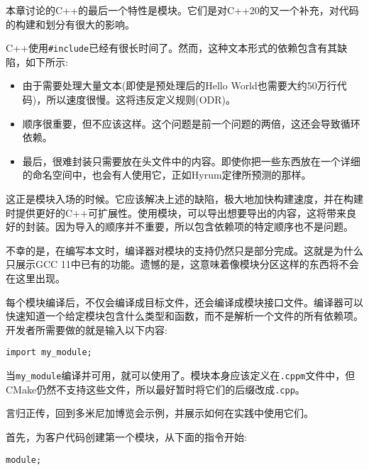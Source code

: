 本章讨论的C++的最后一个特性是模块。它们是对C++20的又一个补充，对代码的构建和划分有很大的影响。

C++使用\texttt{\#include}已经有很长时间了。然而，这种文本形式的依赖包含有其缺陷，如下所示:

\begin{itemize}
\item 
由于需要处理大量文本(即使是预处理后的Hello World也需要大约50万行代码)，所以速度很慢。这将违反定义规则(ODR)。

\item 
顺序很重要，但不应该这样。这个问题是前一个问题的两倍，这还会导致循环依赖。

\item 
最后，很难封装只需要放在头文件中的内容。即使你把一些东西放在一个详细的命名空间中，也会有人使用它，正如Hyrum定律所预测的那样。
\end{itemize}

这正是模块入场的时候。它应该解决上述的缺陷，极大地加快构建速度，并在构建时提供更好的C++可扩展性。使用模块，可以导出想要导出的内容，这将带来良好的封装。因为导入的顺序并不重要，所以包含依赖项的特定顺序也不是问题。

\begin{tcolorbox}[colback=blue!5!white,colframe=blue!75!black, title=Note]
\hspace*{0.75cm}不幸的是，在编写本文时，编译器对模块的支持仍然只是部分完成。这就是为什么只展示GCC 11中已有的功能。遗憾的是，这意味着像模块分区这样的东西将不会在这里出现。
\end{tcolorbox}

每个模块编译后，不仅会编译成目标文件，还会编译成模块接口文件。编译器可以快速知道一个给定模块包含什么类型和函数，而不是解析一个文件的所有依赖项。开发者所需要做的就是输入以下内容:

\begin{lstlisting}[style=styleCXX]
import my_module;
\end{lstlisting}

当\texttt{my\_module}编译并可用，就可以使用了。模块本身应该定义在\texttt{.cppm}文件中，但CMake仍然不支持这些文件，所以最好暂时将它们的后缀改成\texttt{.cpp}。

言归正传，回到多米尼加博览会示例，并展示如何在实践中使用它们。

首先，为客户代码创建第一个模块，从下面的指令开始:

\begin{lstlisting}[style=styleCXX]
module;
\end{lstlisting}


